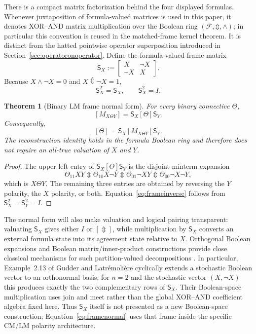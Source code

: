 \documentclass[11pt]{article}
\newtheorem{theorem}{Theorem}[section]
\theoremstyle{definition}
\theoremstyle{remark}
\newcommand{\cF}{\mathcal F}
\newcommand{\xor}{\mathbin{\Updownarrow}}
\begin{document}
There is a compact matrix factorization behind the four displayed formulas.  Whenever juxtaposition of formula-valued matrices is used in this paper, it denotes XOR--AND matrix multiplication over the Boolean ring $(\cF,\xor,\land)$; in particular this convention is reused in the matched-frame kernel theorem.  It is distinct from the hatted pointwise operator superposition introduced in Section~\ref{sec:operatoronoperator}.
Define the formula-valued frame matrix
\begin{equation}
 \mathsf S_X:=
 \begin{bmatrix}
 X&\neg X\\
 \neg X&X
 \end{bmatrix}.
 \label{eq:frameSX}
\end{equation}
Because $X\land\neg X=0$ and $X\xor\neg X=1$,
\begin{equation}
 \mathsf S_X^T=\mathsf S_X,
 \qquad
 \mathsf S_X^2=I.
 \label{eq:frameinvolution}
\end{equation}

\begin{theorem}[Binary LM frame normal form]
For every binary connective $\Theta$,
\begin{equation}
 \boxed{[M_{X\Theta Y}]=\mathsf S_X[\Theta]\mathsf S_Y.}
 \label{eq:framenormal}
\end{equation}
Consequently,
\begin{equation}
 \boxed{[\Theta]=\mathsf S_X[M_{X\Theta Y}]\mathsf S_Y.}
 \label{eq:frameinverse}
\end{equation}
The reconstruction identity holds in the formula Boolean ring and therefore does not require an all-true valuation of $X$ and $Y$.
\end{theorem}
\begin{proof}
The upper-left entry of $\mathsf S_X[\Theta]\mathsf S_Y$ is the disjoint-minterm expansion
\[
 \Theta_{11}XY\xor\Theta_{10}X\neg Y\xor
 \Theta_{01}\neg X Y\xor\Theta_{00}\neg X\neg Y,
\]
which is $X\Theta Y$.  The remaining three entries are obtained by reversing the $Y$ polarity, the $X$ polarity, or both.  Equation~\eqref{eq:frameinverse} follows from $\mathsf S_X^2=\mathsf S_Y^2=I$.
\end{proof}

The normal form will also make valuation and logical pairing transparent: valuating $\mathsf S_X$ gives either $I$ or $[\Updownarrow]$, while multiplication by $\mathsf S_X$ converts an external formula state into its agreement state relative to $X$.  Orthogonal Boolean expansions and Boolean matrix/inner-product constructions provide close classical mechanisms for such partition-valued decompositions \cite{Sampei1950,Gudder2009}.  In particular, Example~2.13 of Gudder and Latr\'emoli\`ere cyclically extends a stochastic Boolean vector to an orthonormal basis; for $n=2$ and the stochastic vector $(X,\neg X)$ this produces exactly the two complementary rows of $\mathsf S_X$.  Their Boolean-space multiplication uses join and meet rather than the global XOR--AND coefficient algebra fixed here.  Thus $\mathsf S_X$ itself is not presented as a new Boolean-space construction; Equation~\eqref{eq:framenormal} uses that frame inside the specific CM/LM polarity architecture.
\end{document}
